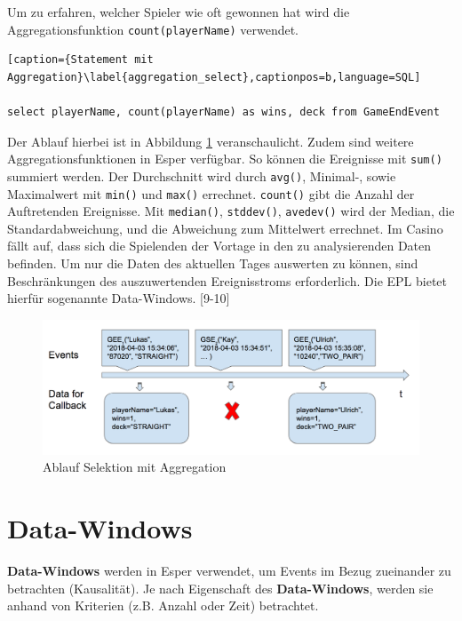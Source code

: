 Um zu erfahren, welcher Spieler wie oft gewonnen hat wird die Aggregationsfunktion \texttt{count(playerName)} verwendet.
\begin{lstlisting}[caption={Statement mit Aggregation}\label{aggregation_select},captionpos=b,language=SQL]

select playerName, count(playerName) as wins, deck from GameEndEvent

\end{lstlisting}
Der Ablauf hierbei ist in Abbildung \ref{aggregation_select_img} veranschaulicht. 
Zudem sind weitere Aggregationsfunktionen in Esper verfügbar.
So können die Ereignisse mit \texttt{sum()} summiert werden. Der Durchschnitt wird durch \texttt{avg()}, Minimal-, sowie Maximalwert mit \texttt{min()} und \texttt{max()} errechnet. \texttt{count()} gibt die Anzahl der Auftretenden Ereignisse. Mit \texttt{median()}, \texttt{stddev()}, \texttt{avedev()} wird der Median, die Standardabweichung, und die Abweichung zum Mittelwert errechnet.
Im Casino fällt auf, dass sich die Spielenden der Vortage in den zu analysierenden Daten befinden. Um nur die Daten des aktuellen Tages auswerten zu können, sind Beschränkungen des auszuwertenden Ereignisstroms erforderlich. Die \acf{EPL} bietet hierfür sogenannte Data-Windows.
\cite{EsperRef2018}[9-10]

\begin{figure}[ht]
	\centering
	\includegraphics[width=\textwidth,height=\textheight, keepaspectratio]{images/statement_basic_aggregation.png}
	\caption{Ablauf Selektion mit Aggregation}
	\label{aggregation_select_img}
\end{figure}

\section{Data-Windows}
\label{Data-Windows}

\textbf{Data-Windows} werden in Esper verwendet, um Events im Bezug zueinander zu betrachten (Kausalität). Je nach Eigenschaft des \textbf{Data-Windows}, werden sie anhand von Kriterien (z.B. Anzahl oder Zeit) betrachtet.

